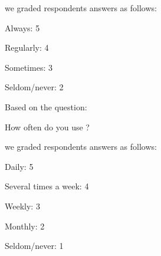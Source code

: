 we graded respondents answers as follows:

\begin{items}
  \item Always: 5
  \item Regularly: 4
  \item Sometimes: 3
  \item Seldom/never: 2
\end{items}

Based on the question:

\begin{items}
  \item How often do you use \urort{}?
\end{items}

we graded respondents answers as follows:

\begin{items}
  \item Daily: 5
  \item Several times a week: 4
  \item Weekly: 3
  \item Monthly: 2
  \item Seldom/never: 1
\end{items}

